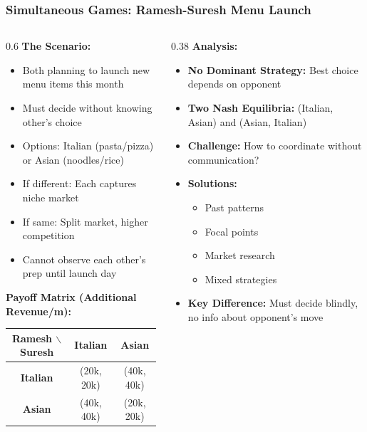 \begin{frame}[fragile]\frametitle{Simultaneous Games: Ramesh-Suresh Menu Launch}
\begin{columns}
    \begin{column}[T]{0.6\linewidth}
      \textbf{The Scenario:}
      \begin{itemize}
        \item Both planning to launch new menu items this month
        \item Must decide without knowing other's choice
        \item Options: Italian (pasta/pizza) or Asian (noodles/rice)
        \item If different: Each captures niche market
        \item If same: Split market, higher competition
        \item Cannot observe each other's prep until launch day
      \end{itemize}
      
      \vspace{2pt}
      \textbf{Payoff Matrix (Additional Revenue/m):}
      \begin{center}
      \begin{tabular}{|c|c|c|}
        \hline
        \textbf{Ramesh $\backslash$ Suresh} & \textbf{Italian} & \textbf{Asian} \\
        \hline
        \textbf{Italian} & (20k, 20k) & (40k, 40k) \\
        \hline
        \textbf{Asian} & (40k, 40k) & (20k, 20k) \\
        \hline
      \end{tabular}
      \end{center}
    \end{column}
    \begin{column}[T]{0.38\linewidth}
      \textbf{Analysis:}
      \begin{itemize}
        \item \textbf{No Dominant Strategy:} Best choice depends on opponent
        \item \textbf{Two Nash Equilibria:} (Italian, Asian) and (Asian, Italian)
        \item \textbf{Challenge:} How to coordinate without communication?
        \item \textbf{Solutions:}
        \begin{itemize}
          \item Past patterns
          \item Focal points
          \item Market research
          \item Mixed strategies
        \end{itemize}
        \item \textbf{Key Difference:} Must decide blindly, no info about opponent's move
      \end{itemize}
    \end{column}
  \end{columns}
\end{frame}

